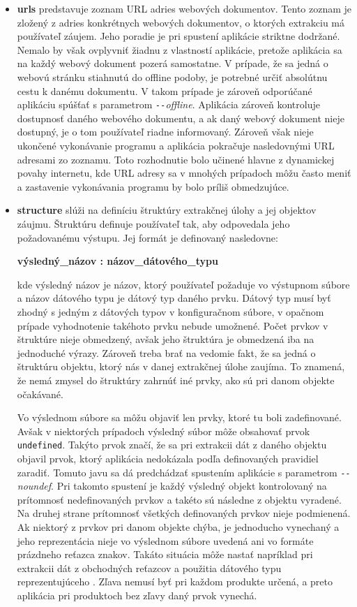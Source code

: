 \begin{itemize}
  \item \textbf{urls} predstavuje zoznam URL adries webových dokumentov. Tento zoznam je zložený z adries konkrétnych webových dokumentov, o ktorých extrakciu má používateľ záujem. Jeho poradie je pri spustení aplikácie striktne dodržané. Nemalo by však ovplyvniť žiadnu z vlastností aplikácie, pretože aplikácia sa na každý webový dokument pozerá samostatne. V prípade, že sa jedná o webovú stránku stiahnutú do offline podoby, je potrebné určiť absolútnu cestu k danému dokumentu. V takom prípade je zároveň odporúčané aplikáciu spúšťať s parametrom \textit{\texttt{-{}-}offline}. Aplikácia zároveň kontroluje dostupnosť daného webového dokumentu, a ak daný webový dokument nieje dostupný, je o tom používateľ riadne informovaný. Zároveň však nieje ukončené vykonávanie programu a aplikácia pokračuje nasledovnými URL adresami zo zoznamu. Toto rozhodnutie bolo učinené hlavne z dynamickej povahy internetu, kde URL adresy sa v mnohých prípadoch môžu často meniť a zastavenie vykonávania programu by bolo príliš obmedzujúce. 
  
  \item \textbf{structure} slúži na definíciu štruktúry extrakčnej úlohy a jej objektov záujmu. Štruktúru definuje používateľ tak, aby odpovedala jeho požadovanému výstupu. Jej formát je definovaný nasledovne:
  
  \textbf{výsledný\_názov : názov\_dátového\_typu}
  
  kde výsledný názov je názov, ktorý používateľ požaduje vo výstupnom súbore a názov dátového typu je  dátový typ daného prvku. Dátový typ musí byť zhodný s jedným z dátových typov v konfiguračnom súbore, v opačnom prípade vyhodnotenie takéhoto prvku nebude umožnené. Počet prvkov v štruktúre nieje obmedzený, avšak jeho štruktúra je obmedzená iba na jednoduché výrazy. Zároveň treba brať na vedomie fakt, že sa jedná o štruktúru objektu, ktorý nás v danej extrakčnej úlohe zaujíma. To znamená, že nemá zmysel do štruktúry zahrnúť iné prvky, ako sú pri danom objekte očakávané.
  
  Vo výslednom súbore sa môžu objaviť len prvky, ktoré tu boli zadefinované. Avšak v niektorých prípadoch výsledný súbor môže obsahovať prvok \texttt{undefined}. Takýto prvok značí, že sa pri extrakcii dát z daného objektu objavil prvok, ktorý aplikácia nedokázala podľa definovaných pravidiel zaradiť. Tomuto javu sa dá predchádzať spustením aplikácie s parametrom \textit{\texttt{-{}-}noundef}. Pri takomto spustení je každý výsledný objekt kontrolovaný na prítomnosť nedefinovaných prvkov a takéto sú následne z objektu vyradené. Na druhej strane prítomnosť všetkých definovaných prvkov nieje podmienená. Ak niektorý z prvkov pri danom objekte chýba, je jednoducho vynechaný a jeho reprezentácia nieje vo výslednom súbore uvedená ani vo formáte prázdneho reťazca znakov. Takáto situácia môže nastať napríklad pri extrakcii dát z obchodných reťazcov a použitia dátového typu reprezentujúceho . Zľava nemusí byť pri každom produkte určená, a preto aplikácia pri produktoch bez zľavy daný prvok vynechá.
  

\end{itemize}
